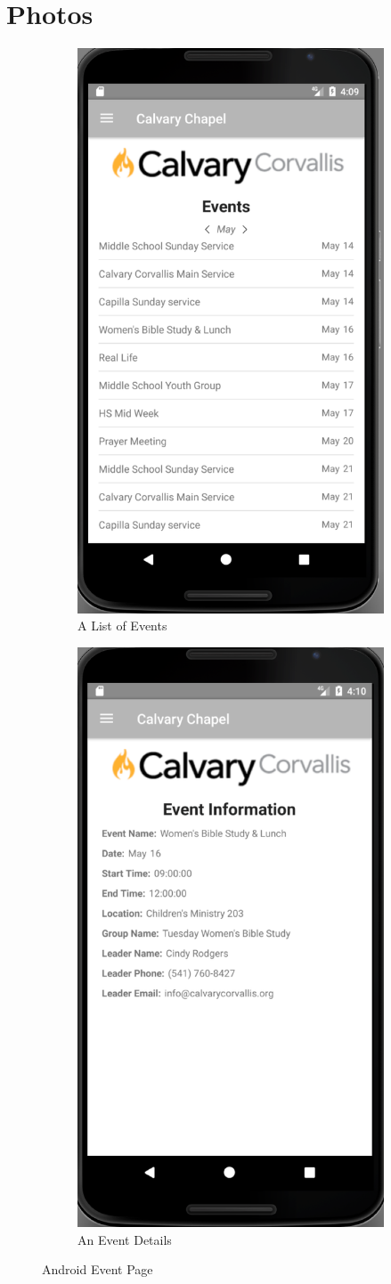 \documentclass[letterpaper,10pt,draftclsnofoot,onecolumn,titlepage]{IEEEtran}
\begin{document}
	
	\section{Photos}
	
	\begin{figure}[H]
			\centering
			\begin{subfigure}{.5\textwidth}
 				 \centering
  				 \includegraphics[width=.4\linewidth]{androidevents}
 				 \caption{A List of Events}
  				 \label{fig:sub1}
			\end{subfigure}%
			\begin{subfigure}{.5\textwidth}
		         	\centering
 				 \includegraphics[width=.4\linewidth]{androiddetails}
 				 \caption{An Event Details}
 				 \label{fig:sub2}
			\end{subfigure}
			\caption{Android Event Page}
			\label{fig:event}
		\end{figure}
\end{document}

